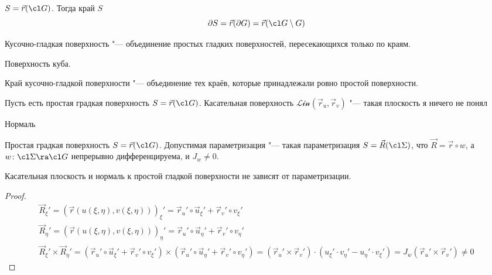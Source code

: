 \begin{Def}
	$S = \vec r(\cl G)$. Тогда край $S$
	\[ \partial S = \vec r(\partial G) = \vec r(\cl G \setminus G) \]
\end{Def}

\begin{Def}
	Кусочно-гладкая поверхность "--- объединение простых гладких поверхностей, пересекающихся только по краям.
\end{Def}

\begin{exmp}
	Поверхность куба.
\end{exmp}

\begin{Def}
	Край кусочно-гладкой поверхности "--- объединение тех краёв, которые принадлежали ровно простой поверхности.
\end{Def}

\begin{Def}
	Пусть есть простая градкая поверхность $S = \vec r(\cl G)$.
	Касательная поверхность $\mathcal{Lin}(\vec r_u, \vec r_v)$ "--- такая плоскость \TODO я ничего не понял
\end{Def}

\TODO Нормаль

\begin{Def}
	Простая градкая поверхность $S = \vec r(\cl G)$.
	Допустимая параметризация "--- такая параметризация $S = \vec R(\cl \Sigma)$,
	что $\vec R = \vec r \circ w$, а $w\colon \cl \Sigma \ra \cl G$ непрерывно дифференцируема, и $J_w \ne 0$.
\end{Def}

\begin{theorem}
	Касательная плоскость и нормаль к простой гладкой поверхности не зависят от параметризации.
\end{theorem}
\begin{proof}
	\begin{gather*}
		\vec R_\xi'
		= (\vec r(u(\xi,\eta),v(\xi,\eta)))_\xi'
		= \vec r_u' \circ \vec u_\xi'  + \vec r_v' \circ v_\xi'  \\
		\vec R_\eta'
		= (\vec r(u(\xi,\eta),v(\xi,\eta)))_\eta'
		= \vec r_u' \circ \vec u_\eta' + \vec r_v' \circ v_\eta' \\
		\vec R_\xi' \times \vec R_\eta'
		= (\vec r_u' \circ \vec u_\xi'  + \vec r_v' \circ v_\xi' ) \times (\vec r_u' \circ \vec u_\eta' + \vec r_v' \circ v_\eta')
		= (\vec r_u' \times \vec r_v') \cdot (u_\xi' \cdot v_\eta' - u_\eta' \cdot v_\xi')
		= J_w(\vec r_u' \times \vec r_v') \ne 0
	\end{gather*}
\end{proof}

